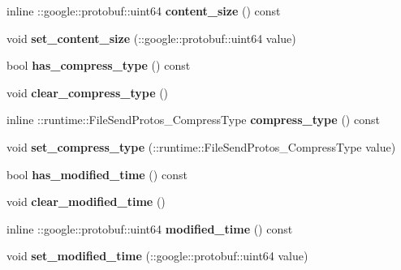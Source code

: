 \begin{DoxyCompactItemize}
inline \+::google\+::protobuf\+::uint64 {\bfseries content\+\_\+size} () const
\item 
\mbox{\label{classruntime_1_1FileSendProtos_a4083d44ce70f2d8b3362fc30d70f2b9c}} 
void {\bfseries set\+\_\+content\+\_\+size} (\+::google\+::protobuf\+::uint64 value)
\item 
\mbox{\label{classruntime_1_1FileSendProtos_a7bf324f456dd2eb7f586202c58dcecc6}} 
bool {\bfseries has\+\_\+compress\+\_\+type} () const
\item 
\mbox{\label{classruntime_1_1FileSendProtos_a148b840333ecd4d8e2d71f57c2ddb8dc}} 
void {\bfseries clear\+\_\+compress\+\_\+type} ()
\item 
\mbox{\label{classruntime_1_1FileSendProtos_a37b2995455f79ea4fd127a66323a62bb}} 
inline \+::runtime\+::\+File\+Send\+Protos\+\_\+\+Compress\+Type {\bfseries compress\+\_\+type} () const
\item 
\mbox{\label{classruntime_1_1FileSendProtos_ae514ed720bd878ea71312024c7ed5ef7}} 
void {\bfseries set\+\_\+compress\+\_\+type} (\+::runtime\+::\+File\+Send\+Protos\+\_\+\+Compress\+Type value)
\item 
\mbox{\label{classruntime_1_1FileSendProtos_a4f679752bb0b3b3f7aa09245f7744712}} 
bool {\bfseries has\+\_\+modified\+\_\+time} () const
\item 
\mbox{\label{classruntime_1_1FileSendProtos_ac48b3c614c6ddc43a05b668e23eb6d8f}} 
void {\bfseries clear\+\_\+modified\+\_\+time} ()
\item 
\mbox{\label{classruntime_1_1FileSendProtos_a26676ce774589a599d5a70fce3359a82}} 
inline \+::google\+::protobuf\+::uint64 {\bfseries modified\+\_\+time} () const
\item 
\mbox{\label{classruntime_1_1FileSendProtos_a93d03cc850cc8a2126ec5b3e57421634}} 
void {\bfseries set\+\_\+modified\+\_\+time} (\+::google\+::protobuf\+::uint64 value)

\end{DoxyCompactItemize}
